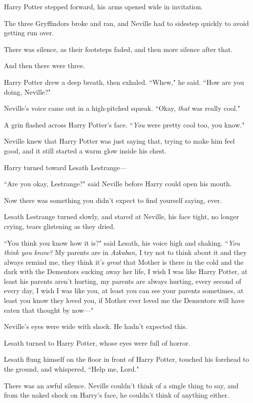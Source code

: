 Harry Potter stepped forward, his arms opened wide in invitation.

The three Gryffindors broke and ran, and Neville had to sidestep quickly to avoid getting run over.

There was silence, as their footsteps faded, and then more silence after that.

And then there were three.

Harry Potter drew a deep breath, then exhaled. ``Whew," he said. ``How are you doing, Neville?"

Neville's voice came out in a high-pitched squeak. ``Okay, \emph{that} was really cool."

A grin flashed across Harry Potter's face. ``\emph{You} were pretty cool too, you know."

Neville knew that Harry Potter was just saying that, trying to make him feel good, and it still started a warm glow inside his chest.

Harry turned toward Lesath Lestrange—

``Are you okay, Lestrange?" said Neville before Harry could open his mouth.

Now there was something you didn't expect to find yourself saying, ever.

Lesath Lestrange turned slowly, and stared at Neville, his face tight, no longer crying, tears glistening as they dried.

``You think you know how it is?" said Lesath, his voice high and shaking. ``\emph{You think you know?} My parents are in \emph{Azkaban,} I try not to think about it and they always remind me, they think it's \emph{great} that Mother is there in the cold and the dark with the Dementors sucking away her life, I wish I was like Harry Potter, at least his parents aren't hurting, my parents are always hurting, every second of every day, I wish I was like you, at least you can see your parents sometimes, at least you know they loved you, if Mother ever loved me the Dementors will have eaten that thought by now—"

Neville's eyes were wide with shock. He hadn't expected this.

Lesath turned to Harry Potter, whose eyes were full of horror.

Lesath flung himself on the floor in front of Harry Potter, touched his forehead to the ground, and whispered, ``Help me, Lord."

There was an awful silence. Neville couldn't think of a single thing to say, and from the naked shock on Harry's face, he couldn't think of anything either.

